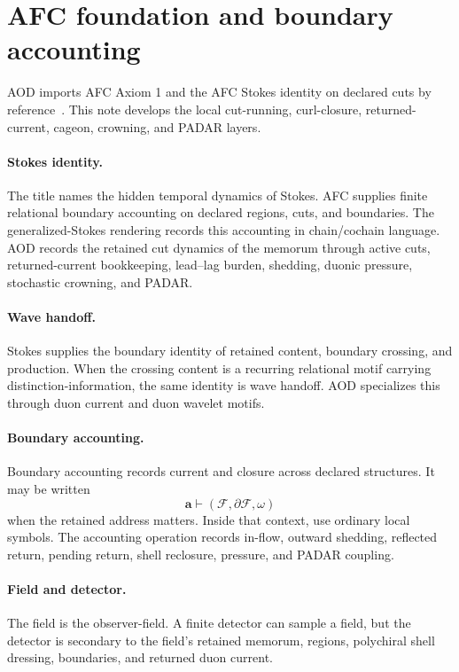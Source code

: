 \section{AFC foundation and boundary accounting}\label{sec:afc-boundary-foundation}

AOD imports AFC Axiom 1 and the AFC Stokes identity on declared cuts by reference~\cite{afc}. This note develops the local cut-running, curl-closure, returned-current, cageon, crowning, and PADAR layers.

\paragraph{Stokes identity.}
The title names the hidden temporal dynamics of Stokes. AFC supplies finite relational boundary accounting on declared regions, cuts, and boundaries. The generalized-Stokes rendering records this accounting in chain/cochain language. AOD records the retained cut dynamics of the memorum through active cuts, returned-current bookkeeping, lead--lag burden, shedding, duonic pressure, stochastic crowning, and PADAR.

\paragraph{Wave handoff.}
Stokes supplies the boundary identity of retained content, boundary crossing, and production. When the crossing content is a recurring relational motif carrying distinction-information, the same identity is wave handoff. AOD specializes this through duon current and duon wavelet motifs.

\paragraph{Boundary accounting.}
Boundary accounting records current and closure across declared structures. It may be written
\[
\mathbf a\vdash(\mathcal F,\partial\mathcal F,\omega)
\]
when the retained address matters. Inside that context, use ordinary local symbols. The accounting operation records in-flow, outward shedding, reflected return, pending return, shell reclosure, pressure, and PADAR coupling.

\paragraph{Field and detector.}
The field is the observer-field. A finite detector can sample a field, but the detector is secondary to the field's retained memorum, regions, polychiral shell dressing, boundaries, and returned duon current.
